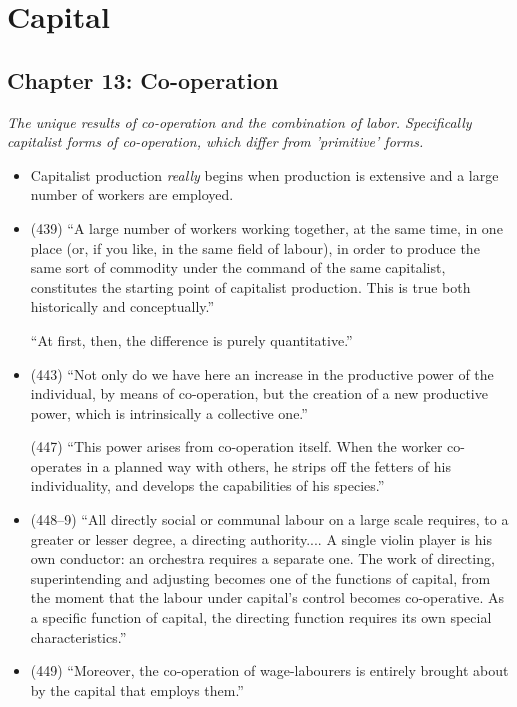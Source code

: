 \documentclass[a4paper,12pt]{article}
\begin{document}
\tableofcontents
\newpage

\section{Capital}

\subsection{Chapter 13: Co-operation}
\textit{The unique results of co-operation and the combination of labor. Specifically capitalist forms of co-operation, which differ from 'primitive' forms.}

\begin{itemize}
\item
Capitalist production \textit{really} begins when production is extensive and a large number of workers are employed.

\item
(439) ``A large number of workers working together, at the same time, in one place (or, if you like, in the same field of labour), in order to produce the same sort of commodity under the command of the same capitalist, constitutes the starting point of capitalist production. This is true both historically and conceptually.''

\subitem
``At first, then, the difference is purely quantitative.''

\item
(443) ``Not only do we have here an increase in the productive power of the individual, by means of co-operation, but the creation of a new productive power, which is intrinsically a collective one.''

\subitem
(447) ``This power arises from co-operation itself. When the worker co-operates in a planned way with others, he strips off the fetters of his individuality, and develops the capabilities of his species.''

\item
(448--9) ``All directly social or communal labour on a large scale requires, to a greater or lesser degree, a directing authority.... A single violin player is his own conductor: an orchestra requires a separate one. The work of directing, superintending and adjusting becomes one of the functions of capital, from the moment that the labour under capital's control becomes co-operative. As a specific function of capital, the directing function requires its own special characteristics.''

\item
(449) ``Moreover, the co-operation of wage-labourers is entirely brought about by the capital that employs them.''


\end{itemize}
\end{document}

